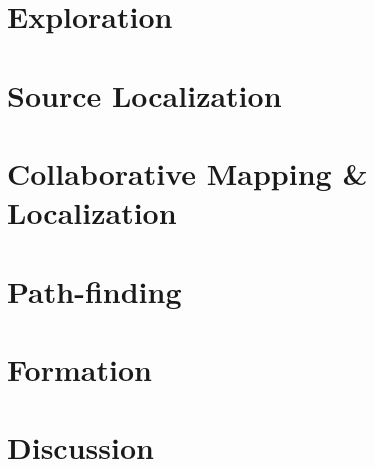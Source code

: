 \documentclass[a4paper]{article}
\begin{document}
 \section{Exploration}
  
 
 \section{Source Localization}
  
 
 \section{Collaborative Mapping \& Localization}
  
 
 \section{Path-finding}
  
 
 \section{Formation}
 \label{sec:Formation}
  
\section{Discussion}
 \label{sec:Discussion}
  




\end{document}
